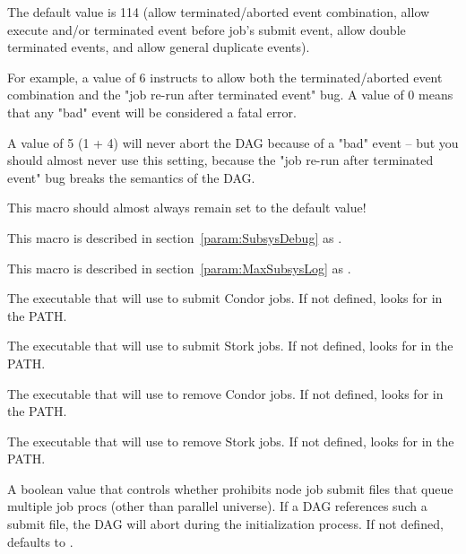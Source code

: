 \begin{description}
The default value is 114 (allow terminated/aborted event combination,
allow execute and/or terminated event before job's submit event, allow
double terminated events, and allow general duplicate events).

For example, a value of 6 instructs  to allow both
the terminated/aborted event combination and the "job re-run
after terminated event" bug.  A value of 0 means that any "bad"
event will be considered a fatal error.

A value of 5 (1 + 4) will never abort the DAG because of a "bad"
event -- but you should almost never use this setting, because
the "job re-run after terminated event" bug breaks the semantics of
the DAG.

This macro should almost always remain set to the default value!

\item[\Macro{DAGMAN\_DEBUG}] \label{param:DAGManDebug} This macro
is described in section~\ref{param:SubsysDebug} as
.

\item[\Macro{MAX\_DAGMAN\_LOG}] \label{Param:MaxDAGManLog} This macro
is described in section~\ref{param:MaxSubsysLog} as
.

\item[\Macro{DAGMAN\_CONDOR\_SUBMIT\_EXE}]
\label{param:DAGManCondorSubmitExe}
The executable that  will use to submit Condor jobs.
If not defined,  looks for  in the PATH.

\item[\Macro{DAGMAN\_STORK\_SUBMIT\_EXE}]
\label{param:DAGManStorkSubmitExe}
The executable that  will use to submit Stork jobs.
If not defined,  looks for  in the PATH.

\item[\Macro{DAGMAN\_CONDOR\_RM\_EXE}]
\label{param:DAGManCondorRmExe}
The executable that  will use to remove Condor jobs.
If not defined,  looks for  in the PATH.

\item[\Macro{DAGMAN\_STORK\_RM\_EXE}]
\label{param:DAGManStorkRmExe}
The executable that  will use to remove Stork jobs.
If not defined,  looks for  in the PATH.

\item[\Macro{DAGMAN\_PROHIBIT\_MULTI\_JOBS}]
\label{param:DAGManProhibitMultiJobs}
A boolean value that controls whether  prohibits
node job submit files that queue multiple job procs (other than 
parallel universe).  If a DAG references such a submit file, the
DAG will abort during the initialization process.  If not defined,
 defaults to .


\end{description}
